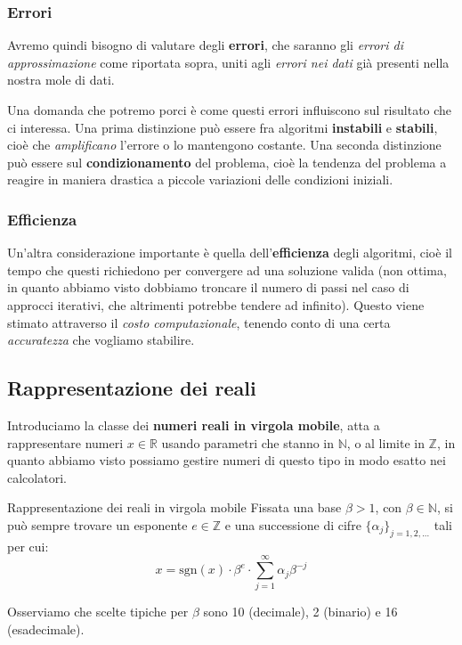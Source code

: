 \documentclass[a4paper,11pt]{article}
\begin{document}
\subsubsection{Errori}
Avremo quindi bisogno di valutare degli \textbf{errori}, che saranno gli \textit{errori di approssimazione} come riportata sopra, uniti agli \textit{errori nei dati} già presenti nella nostra mole di dati.

Una domanda che potremo porci è come questi errori influiscono sul risultato che ci interessa.
Una prima distinzione può essere fra algoritmi \textbf{instabili} e \textbf{stabili}, cioè che \textit{amplificano} l'errore o lo mantengono costante.
Una seconda distinzione può essere sul \textbf{condizionamento} del problema, cioè la tendenza del problema a reagire in maniera drastica a piccole variazioni delle condizioni iniziali.

\subsubsection{Efficienza}
Un'altra considerazione importante è quella dell'\textbf{efficienza} degli algoritmi, cioè il tempo che questi richiedono per convergere ad una soluzione valida (non ottima, in quanto abbiamo visto dobbiamo troncare il numero di passi nel caso di approcci iterativi, che altrimenti potrebbe tendere ad infinito).
Questo viene stimato attraverso il \textit{costo computazionale}, tenendo conto di una certa \textit{accuratezza} che vogliamo stabilire.

\subsection{Rappresentazione dei reali}
Introduciamo la classe dei \textbf{numeri reali in virgola mobile}, atta a rappresentare numeri $x \in \mathbb{R}$ usando parametri che stanno in $\mathbb{N}$, o al limite in $\mathbb{Z}$, in quanto abbiamo visto possiamo gestire numeri di questo tipo in modo esatto nei calcolatori.

\begin{theorem}{Rappresentazione dei reali in virgola mobile}	
Fissata una base $\beta > 1$, con $\beta \in \mathbb{N}$, si può sempre trovare un esponente $e \in \mathbb{Z}$ e una successione di cifre $\{\alpha_j\}_{j = 1,2, ...}$ tali per cui:
$$
x = \mathrm{sgn}(x) \cdot \beta^e \cdot \sum_{j=1}^\infty \alpha_j \beta^{-j}
$$
\end{theorem}

Osserviamo che scelte tipiche per $\beta$ sono 10 (decimale), 2 (binario) e 16 (esadecimale).
\end{document}
